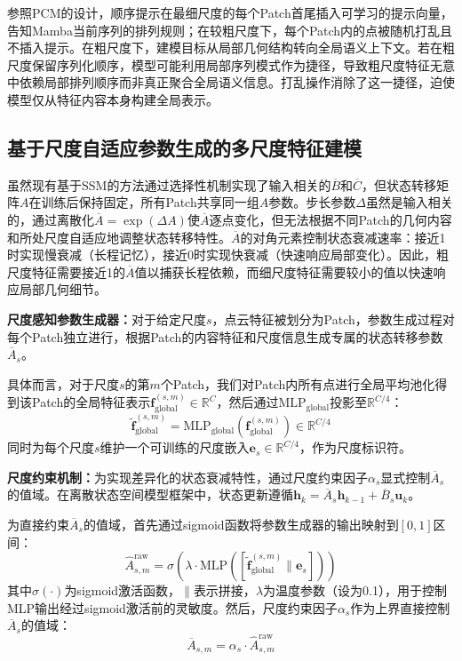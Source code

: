 \documentclass[12pt,a4paper,openany,oneside]{ctexbook}
\theoremstyle{definition}
\theoremstyle{remark}
\begin{document}
参照PCM\cite{pcm}的设计，顺序提示在最细尺度的每个Patch首尾插入可学习的提示向量，告知Mamba当前序列的排列规则；在较粗尺度下，每个Patch内的点被随机打乱且不插入提示。在粗尺度下，建模目标从局部几何结构转向全局语义上下文。若在粗尺度保留序列化顺序，模型可能利用局部序列模式作为捷径，导致粗尺度特征无意中依赖局部排列顺序而非真正聚合全局语义信息。打乱操作消除了这一捷径，迫使模型仅从特征内容本身构建全局表示。


\subsection{基于尺度自适应参数生成的多尺度特征建模}

虽然现有基于SSM的方法通过选择性机制实现了输入相关的$\overline{B}$和$\overline{C}$，但状态转移矩阵$A$在训练后保持固定，所有Patch共享同一组$A$参数。步长参数$\Delta$虽然是输入相关的，通过离散化$\overline{A} = \exp(\Delta A)$使$\overline{A}$逐点变化，但无法根据不同Patch的几何内容和所处尺度自适应地调整状态转移特性。$\overline{A}$的对角元素控制状态衰减速率：接近1时实现慢衰减（长程记忆），接近0时实现快衰减（快速响应局部变化）。因此，粗尺度特征需要接近1的$\overline{A}$值以捕获长程依赖，而细尺度特征需要较小的值以快速响应局部几何细节。

\textbf{尺度感知参数生成器：}对于给定尺度$s$，点云特征被划分为Patch，参数生成过程对每个Patch独立进行，根据Patch的内容特征和尺度信息生成专属的状态转移参数$\overline{A}_s$。

具体而言，对于尺度$s$的第$m$个Patch，我们对Patch内所有点进行全局平均池化得到该Patch的全局特征表示$\mathbf{f}_{\text{global}}^{(s,m)} \in \mathbb{R}^{C}$，然后通过$\text{MLP}_{\text{global}}$投影至$\mathbb{R}^{C/4}$：
\begin{equation}
	\tilde{\mathbf{f}}_{\text{global}}^{(s,m)} = \text{MLP}_{\text{global}}(\mathbf{f}_{\text{global}}^{(s,m)}) \in \mathbb{R}^{C/4}
\end{equation}
同时为每个尺度$s$维护一个可训练的尺度嵌入$\mathbf{e}_s \in \mathbb{R}^{C/4}$，作为尺度标识符。

\textbf{尺度约束机制：}为实现差异化的状态衰减特性，通过尺度约束因子$\alpha_s$显式控制$\overline{A}_s$的值域。在离散状态空间模型框架中，状态更新遵循$\mathbf{h}_k = \overline{A}_s\mathbf{h}_{k-1} + \overline{B}_s\mathbf{u}_k$。

为直接约束$\overline{A}_s$的值域，首先通过sigmoid函数将参数生成器的输出映射到$[0,1]$区间：
\begin{equation}
	\hat{A}_{s,m}^{\text{raw}} = \sigma(\lambda \cdot \text{MLP}([\tilde{\mathbf{f}}_{\text{global}}^{(s,m)} \| \mathbf{e}_s]))
	\label{eq:param_norm}
\end{equation}
其中$\sigma(\cdot)$为sigmoid激活函数，$\|$表示拼接，$\lambda$为温度参数（设为0.1），用于控制MLP输出经过sigmoid激活前的灵敏度。然后，尺度约束因子$\alpha_s$作为上界直接控制$\overline{A}_s$的值域：
\begin{equation}
	\overline{A}_{s,m} = \alpha_s \cdot \hat{A}_{s,m}^{\text{raw}}
	\label{eq:param_modulation}
\end{equation}
\end{document}
